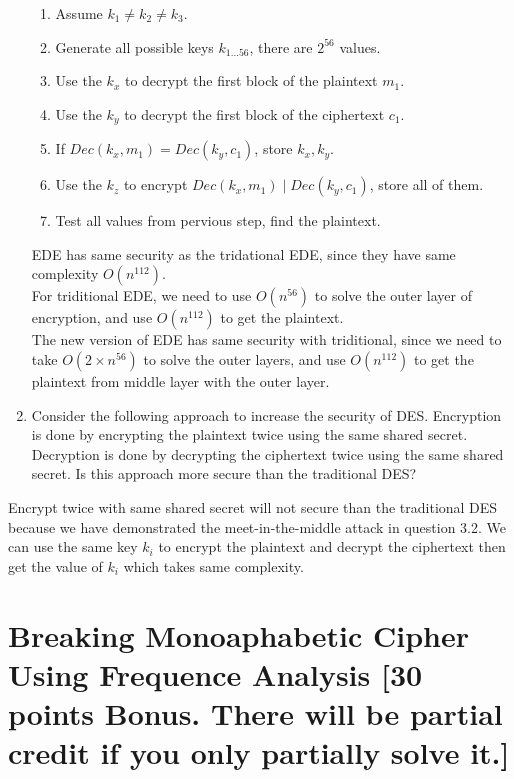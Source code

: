 \documentclass[11pt]{article}
\begin{document}
\begin{enumerate}
  \begin{enumerate}
    \item Assume $k_{1}\neq k_{2}\neq k_{3}$.
    \item Generate all possible keys $k_{1\ldots 56}$, there are $2^{56}$ values.
    \item Use the $k_{x}$ to decrypt the first block of the plaintext $m_{1}$.
    \item Use the $k_{y}$ to decrypt the first block of the ciphertext $c_{1}$.
    \item If $Dec(k_{x}, m_{1})=Dec(k_{y}, c_{1})$, store $k_{x}, k_{y}$.
    \item Use the $k_{z}$ to encrypt $Dec(k_{x}, m_{1})\mid Dec(k_{y}, c_{1})$, store all of them.
    \item Test all values from pervious step, find the plaintext.
  \end{enumerate}

  EDE has same security as the tridational EDE, since they have same complexity $O\left(n^{112}\right)$. \\

  For triditional EDE, we need to use $O\left(n^{56}\right)$ to solve the outer layer of encryption, and use $O\left(n^{112}\right)$ to get the plaintext. \\

  The new version of EDE has same security with triditional, since we need to take $O\left(2 \times n^{56}\right)$ to solve the outer layers, and use $O\left(n^{112}\right)$ to get the plaintext from middle layer with the outer layer.

\item Consider the following approach to increase the security of DES. Encryption is done by encrypting the plaintext twice using the same shared secret. Decryption is done by decrypting the ciphertext twice using the same shared secret. Is this approach more secure than the traditional DES?
\end{enumerate}

Encrypt twice with same shared secret will not secure than the traditional DES because we have demonstrated the meet-in-the-middle attack in question 3.2. We can use the same key $k_{i}$ to encrypt the plaintext and decrypt the ciphertext then get the value of $k_{i}$ which takes same complexity.

\section{Breaking Monoaphabetic Cipher Using Frequence Analysis [30 points Bonus. There will be partial credit if you only partially solve it.]}
\end{document}
